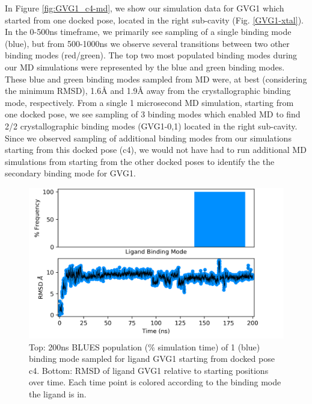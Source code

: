 In Figure \ref{fig:GVG1_c4-md}, we show our simulation data for GVG1 which started from one docked pose, located in the right sub-cavity (Fig. \ref{GVG1-xtal}).
In the 0-500ns timeframe, we primarily see sampling of a single binding mode (blue), but from 500-1000ns we observe several transitions between two other binding modes (red/green).
The top two most populated binding modes during our MD simulations were represented by the blue and green binding modes.
These blue and green binding modes sampled from MD were, at best (considering the minimum RMSD), 1.6{\AA} and 1.9{\AA} away from the crystallographic binding mode, respectively.
From a single 1 microsecond MD simulation, starting from one docked pose, we see sampling of 3 binding modes which enabled MD to find 2/2 crystallographic binding modes (GVG1-0,1) located in the right sub-cavity.
Since we observed sampling of additional binding modes from our simulations starting from this docked pose (c4), we would not have had to run additional MD simulations from starting from the other docked poses to identify the the secondary binding mode for GVG1.

\begin{figure}
    \centering
    \includegraphics[width=\linewidth]{chapter6/Figures/GVG_1_c4-14650607.png}
    \caption[GVG1 (c4) BLUES Populations]{Top: 200ns BLUES population (\% simulation time) of 1 (blue) binding mode sampled for ligand GVG1 starting from docked pose c4. Bottom: RMSD of ligand GVG1 relative to starting positions over time. Each time point is colored according to the binding mode the ligand is in.}
    \label{fig:GVG1_c4-blues}
\end{figure}

